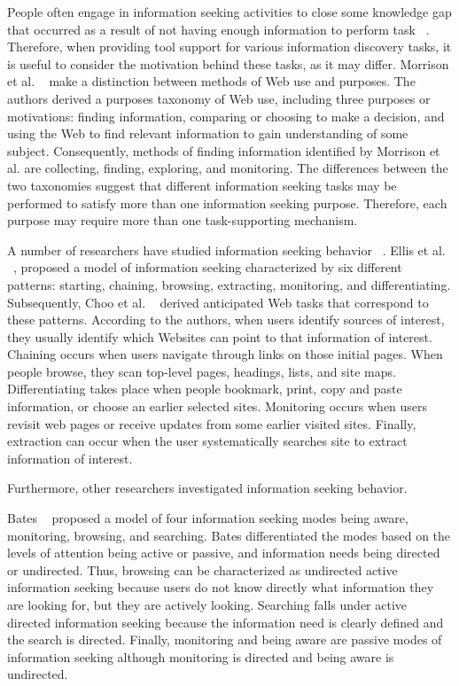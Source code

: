 \documentclass{casconpaper}
\begin{document}
{People often engage in information seeking activities to close some knowledge gap that occurred as a result of not having enough information to perform task ~\cite{proper}. Therefore, when providing tool support for various information discovery tasks, it is useful to consider the motivation behind these tasks, as it may differ. Morrison et al. ~\cite{morrison} make a distinction between methods of Web use and purposes. The authors derived a purposes taxonomy of Web use, including three purposes or motivations: finding information, comparing or choosing to make a decision, and using the Web to find relevant information to gain understanding of some subject. Consequently, methods of finding information identified by Morrison et al. are collecting, finding, exploring, and monitoring. The differences between the two taxonomies suggest that different information seeking tasks may be performed to satisfy more than one information seeking purpose. Therefore, each purpose may require more than one task-supporting mechanism. 

A number of researchers have studied information seeking behavior ~\cite{bates2002, bates1986, choo, ellis1989, ellis1997, ellis1993}. Ellis et al. ~\cite{ellis1989, ellis1997, ellis1993}, proposed a model of information seeking characterized by six different patterns: starting, chaining, browsing, extracting, monitoring, and differentiating. Subsequently, Choo et al. ~\cite{choo} derived anticipated Web tasks that correspond to these patterns. According to the authors, when users identify sources of interest, they usually identify which Websites can point to that information of interest.  Chaining occurs when users navigate through links on those initial pages. When people browse, they scan top-level pages, headings, lists, and site maps. Differentiating takes place when people bookmark, print, copy and paste information, or choose an earlier selected sites. Monitoring occurs when users revisit web pages or receive updates from some earlier visited sites. Finally, extraction can occur when the user systematically searches site to extract information of interest.

Furthermore, other researchers investigated information seeking behavior. 

Bates ~\cite{bates1986} proposed a model of four information seeking modes being aware, monitoring, browsing, and searching. Bates differentiated the modes based on the levels of attention being active or passive, and information needs being directed or undirected. Thus, browsing can be characterized as undirected active information seeking because users do not know directly what information they are looking for, but they are actively looking. Searching falls under active directed information seeking because the information need is clearly defined and the search is directed. Finally, monitoring and being aware are passive modes of information seeking although monitoring is directed and being aware is undirected.   

}
\end{document}
